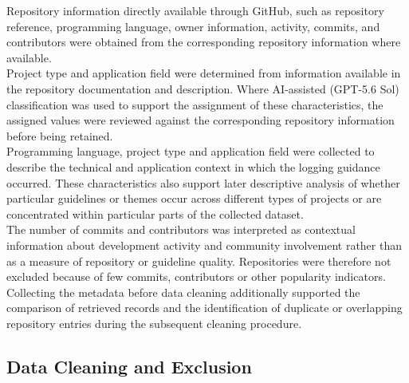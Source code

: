 Repository information directly available through GitHub, such as repository
reference, programming language, owner information, activity, commits, and
contributors were obtained from the corresponding repository information where
available.
\\
Project type and application field were determined from information available in the
repository documentation and description. Where AI-assisted (GPT-5.6 Sol) classification was
used to support the assignment of these characteristics, the assigned values were
reviewed against the corresponding repository information before being retained.
\\
Programming language, project type and application field were collected to describe
the technical and application context in which the logging guidance occurred. These
characteristics also support later descriptive analysis of whether particular
guidelines or themes occur across different types of projects or are concentrated
within particular parts of the collected dataset.
\\
The number of commits and contributors was interpreted as contextual information
about development activity and community involvement rather than as a measure of
repository or guideline quality. Repositories were therefore not excluded
because of few commits, contributors or other popularity indicators.
\\
Collecting the metadata before data cleaning additionally supported the comparison of
retrieved records and the identification of duplicate or overlapping repository
entries during the subsequent cleaning procedure.

\subsection{Data Cleaning and Exclusion}

